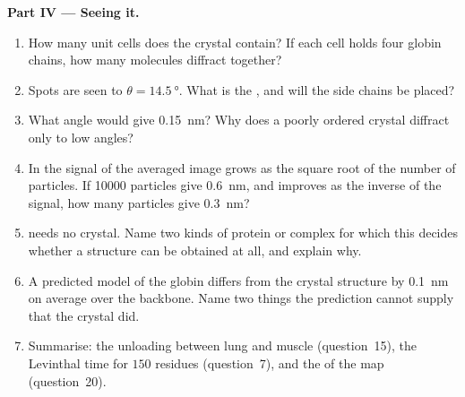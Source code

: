 \begin{problem}
\medskip
\noindent\textbf{Part IV --- Seeing it.}
\begin{enumerate}[resume]
  \item How many unit cells does the crystal contain? If each cell
        holds four globin chains, how many molecules diffract together?
  \item Spots are seen to $\theta = \qty{14.5}{\degree}$. What is the
        , and will the side chains be placed?
  \item What angle would give \qty{0.15}{nm}? Why does a poorly
        ordered crystal diffract only to low angles?
  \item In  the signal of the averaged image
        grows as the square root of the number of particles. If
        \num{10000} particles give \qty{0.6}{nm}, and 
        improves as the inverse of the signal, how many particles
        give \qty{0.3}{nm}?
  \item {} needs no crystal. Name two kinds of
        protein or complex for which this decides whether a structure
        can be obtained at all, and explain why.
  \item A predicted model of the globin differs from the crystal
        structure by \qty{0.1}{nm} on average over the backbone. Name
        two things the prediction cannot supply that the crystal did.
  \item Summarise: the unloading between lung and muscle (question~15),
        the Levinthal time for $150$ residues (question~7), and the
         of the map (question~20).
\end{enumerate}
\end{problem}
